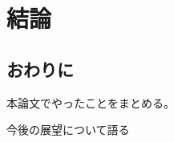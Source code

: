 \chapter{結論}\label{chap:conclusion}

\section{おわりに}\label{ux304aux308fux308aux306b}

本論文でやったことをまとめる。

今後の展望について語る

